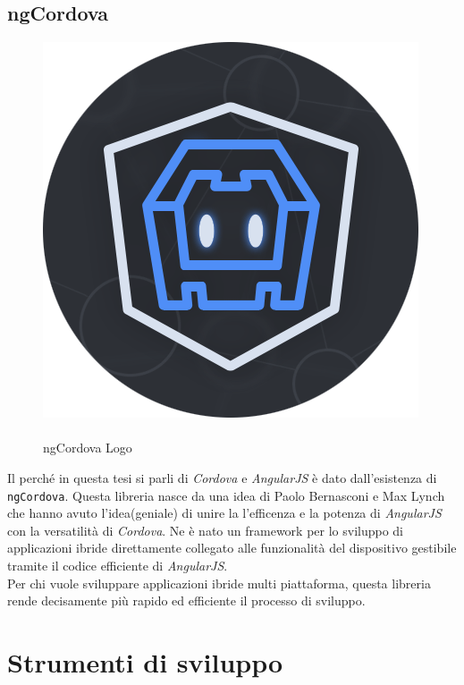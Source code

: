 \subsection{ngCordova}
\label{sec:ngCordova}
\begin{figure}
  \vspace{-65pt}
  \begin{center}
    \includegraphics[scale=0.35]{Figures/ngcordova-logo.png}
  \end{center}
  \vspace{-10pt}
  \caption{\\ngCordova Logo}
  \label{fig:ngCordova}
  \vspace{0pt}
\end{figure}

Il perché in questa tesi si parli di \emph{Cordova} e \emph{AngularJS} è dato dall'esistenza di \texttt{ngCordova}. Questa libreria nasce da una idea di Paolo Bernasconi e Max Lynch che hanno avuto l'idea(geniale) di unire la l'efficenza e la potenza di \emph{AngularJS} con la versatilità di \emph{Cordova}. Ne è nato un framework per lo sviluppo di applicazioni ibride direttamente collegato alle funzionalità del dispositivo gestibile tramite il codice efficiente di \emph{AngularJS}.\\
Per chi vuole sviluppare applicazioni ibride multi piattaforma, questa libreria rende decisamente più rapido ed efficiente il processo di sviluppo.

\section{Strumenti di sviluppo}

